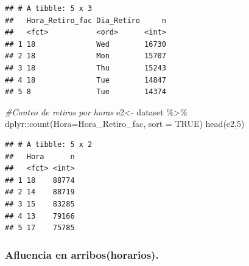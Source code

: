 \documentclass[
]{article}
\newenvironment{Shaded}{\begin{snugshade}}{\end{snugshade}}
\newcommand{\AttributeTok}[1]{\textcolor[rgb]{0.77,0.63,0.00}{#1}}
\newcommand{\CommentTok}[1]{\textcolor[rgb]{0.56,0.35,0.01}{\textit{#1}}}
\newcommand{\ConstantTok}[1]{\textcolor[rgb]{0.00,0.00,0.00}{#1}}
\newcommand{\DecValTok}[1]{\textcolor[rgb]{0.00,0.00,0.81}{#1}}
\newcommand{\FunctionTok}[1]{\textcolor[rgb]{0.00,0.00,0.00}{#1}}
\newcommand{\NormalTok}[1]{#1}
\newcommand{\OtherTok}[1]{\textcolor[rgb]{0.56,0.35,0.01}{#1}}
\newcommand{\SpecialCharTok}[1]{\textcolor[rgb]{0.00,0.00,0.00}{#1}}
\newcommand{\StringTok}[1]{\textcolor[rgb]{0.31,0.60,0.02}{#1}}
\begin{document}
\begin{verbatim}
## # A tibble: 5 x 3
##   Hora_Retiro_fac Dia_Retiro     n
##   <fct>           <ord>      <int>
## 1 18              Wed        16730
## 2 18              Mon        15707
## 3 18              Thu        15243
## 4 18              Tue        14847
## 5 8               Tue        14374
\end{verbatim}

\begin{Shaded}
\begin{Highlighting}[]
\CommentTok{\#Conteo de retiros por horas }
\NormalTok{e2}\OtherTok{\textless{}{-}}\NormalTok{ dataset }\SpecialCharTok{\%\textgreater{}\%}\NormalTok{ dplyr}\SpecialCharTok{::}\FunctionTok{count}\NormalTok{(}\AttributeTok{Hora=}\NormalTok{Hora\_Retiro\_fac, }\AttributeTok{sort =} \ConstantTok{TRUE}\NormalTok{)}
\FunctionTok{head}\NormalTok{(e2,}\DecValTok{5}\NormalTok{)}
\end{Highlighting}
\end{Shaded}

\begin{verbatim}
## # A tibble: 5 x 2
##   Hora      n
##   <fct> <int>
## 1 18    88774
## 2 14    88719
## 3 15    83285
## 4 13    79166
## 5 17    75785
\end{verbatim}

\begin{Shaded}
\end{Shaded}

\hypertarget{afluencia-en-arriboshorarios.}{%
\subsubsection{Afluencia en
arribos(horarios).}\label{afluencia-en-arriboshorarios.}}

\begin{Shaded}
\end{Shaded}
\end{document}
